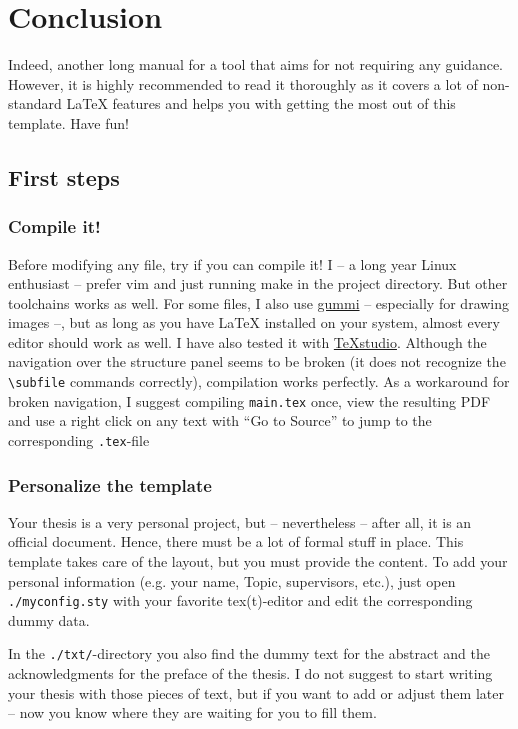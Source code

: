 \documentclass[../main.tex]{subfiles}
\begin{document}
\chapter{Conclusion}

Indeed, another long manual for a tool \cite{Bithappens16Template} that aims for not requiring any guidance.
However, it is highly recommended to read it thoroughly as it covers a lot of non-standard LaTeX features and helps you with getting the most out of this template.
Have fun!

\section{First steps}

\subsection{Compile it!}

Before modifying any file, try if you can compile it!
I -- a long year Linux enthusiast -- prefer vim and just running make in the project directory.
But other toolchains works as well.
For some files, I also use \href{https://github.com/alexandervdm/gummi}{gummi} -- especially for drawing images --, but as long as you have LaTeX installed on your system, almost every editor should work as well.
I have also tested it with \href{http://www.texstudio.org/}{TeXstudio}.
Although the navigation over the structure panel seems to be broken (it does not recognize the \texttt{\textbackslash subfile} commands correctly), compilation works perfectly.
As a workaround for broken navigation, I suggest compiling \texttt{main.tex} once, view the resulting PDF and use a right click on any text with \enquote{Go to Source} to jump to the corresponding \texttt{.tex}-file


\subsection{Personalize the template}

Your thesis is a very personal project, but -- nevertheless -- after all, it is an official document.
Hence, there must be a lot of formal stuff in place.
This template takes care of the layout, but you must provide the content.
To add your personal information (e.g. your name, Topic, supervisors, etc.), just open \texttt{./myconfig.sty} with your favorite tex(t)-editor and edit the corresponding dummy data.

In the \texttt{./txt/}-directory you also find the dummy text for the abstract and the acknowledgments for the preface of the thesis.
I do not suggest to start writing your thesis with those pieces of text, but if you want to add or adjust them later -- now you know where they are waiting for you to fill them.
\end{document}

